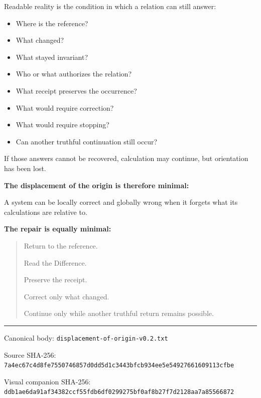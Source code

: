 \documentclass[11pt,letterpaper]{article}
\begin{document}
Readable reality is the condition in which a relation can still answer:
\begin{itemize}
  \item Where is the reference?
  \item What changed?
  \item What stayed invariant?
  \item Who or what authorizes the relation?
  \item What receipt preserves the occurrence?
  \item What would require correction?
  \item What would require stopping?
  \item Can another truthful continuation still occur?
\end{itemize}

If those answers cannot be recovered, calculation may continue, but orientation has been lost.

\textbf{The displacement of the origin is therefore minimal:}\par
A system can be locally correct and globally wrong when it forgets what its calculations are relative to.

\textbf{The repair is equally minimal:}
\begin{quote}
Return to the reference.\par
Read the Difference.\par
Preserve the receipt.\par
Correct only what changed.\par
Continue only while another truthful return remains possible.
\end{quote}

\vspace{1.2em}
\begin{center}
\color{rule}\rule{.76\textwidth}{.45pt}\par\vspace{.7em}
\small\color{muted}
Canonical body: \texttt{displacement-of-origin-v0.2.txt}\par
Source SHA-256: \texttt{7a4ec67c4d8fe7550746857d0dd5d1c3443bfcb934ee5e54927661609113cfbe}\par
Visual companion SHA-256: \texttt{ddb1ae6da91af34382ccf55fdb6df0299275bf0af8b27f7d2128aa7a85566872}
\end{center}
\end{document}
